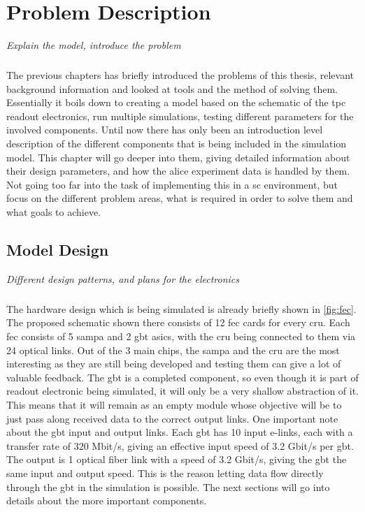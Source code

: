 \documentclass[a4paper, 12pt]{report}
\begin{document}
\chapter{Problem Description}
\textit{Explain the model, introduce the problem}
\label{cha:4}

\paragraph{}
The previous chapters has briefly introduced the problems of this thesis, relevant background information and looked at tools and the method of solving them.
Essentially it boils down to creating a model based on the schematic of the \gls{tpc} readout electronics, run multiple simulations, testing different parameters for the involved components.
Until now there has only been an introduction level description of the different components that is being included in the simulation model.
This chapter will go deeper into them, giving detailed information about their design parameters, and how the \gls{alice} experiment data is handled by them.
Not going too far into the task of implementing this in a \gls{sc} environment, but focus on the different problem areas, what is required in order to solve them and what goals to achieve.

\section{Model Design}
\textit{Different design patterns, and plans for the electronics}
\paragraph{}
The hardware design which is being simulated is already briefly shown in \ref{fig:fec}.
The proposed schematic shown there consists of 12 \gls{fec} cards for every \gls{cru}.
Each \gls{fec} consists of 5 \gls{sampa} and 2 \gls{gbt} \glspl{asic}, with the \gls{cru} being connected to them via 24 optical links.
Out of the 3 main chips, the \gls{sampa} and the \gls{cru} are the most interesting as they are still being developed and testing them can give a lot of valuable feedback.
The \gls{gbt} is a completed component, so even though it is part of readout electronic being simulated, it will only be a very shallow abstraction of it.
This means that it will remain as an empty module whose objective will be to just pass along received data to the correct output links.
One important note about the \gls{gbt} input and output links.
Each \gls{gbt} has 10 input e-links, each with a transfer rate of 320 Mbit/s, giving an effective input speed of 3.2 Gbit/s per \gls{gbt}.
The output is 1 optical fiber link with a speed of 3.2 Gbit/s, giving the \gls{gbt} the same input and output speed.
This is the reason letting data flow directly through the \gls{gbt} in the simulation is possible.
The next sections will go into details about the more important components.
\end{document}
